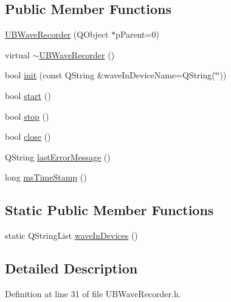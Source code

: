 \subsection*{Public Member Functions}
\begin{DoxyCompactItemize}
\item 
\hyperlink{class_u_b_wave_recorder_a6d2a1330302ac010e93b77d4d62737be}{U\-B\-Wave\-Recorder} (Q\-Object $\ast$p\-Parent=0)
\item 
virtual \hyperlink{class_u_b_wave_recorder_a4c444a83dd8d37c0eb1b244d4922f0fe}{$\sim$\-U\-B\-Wave\-Recorder} ()
\item 
bool \hyperlink{class_u_b_wave_recorder_acab7cce9f4a69c6bcbf219e9d7fb6e83}{init} (const Q\-String \&wave\-In\-Device\-Name=Q\-String(\char`\"{}\char`\"{}))
\item 
bool \hyperlink{class_u_b_wave_recorder_a77eb735ea7e29eca98dcc509afcaa8b7}{start} ()
\item 
bool \hyperlink{class_u_b_wave_recorder_a2e126369041b1c024b42a040d0d9e01a}{stop} ()
\item 
bool \hyperlink{class_u_b_wave_recorder_a061bf8de2624233eea17b658480b5e05}{close} ()
\item 
Q\-String \hyperlink{class_u_b_wave_recorder_ad508b294186513b816def5d194d9a5b3}{last\-Error\-Message} ()
\item 
long \hyperlink{class_u_b_wave_recorder_a7e8b48b4717383c8a7e2c50b132f705b}{ms\-Time\-Stamp} ()
\end{DoxyCompactItemize}
\subsection*{Static Public Member Functions}
\begin{DoxyCompactItemize}
\item 
static Q\-String\-List \hyperlink{class_u_b_wave_recorder_a01abc2b5f2cc6cec749f7075944f4b1c}{wave\-In\-Devices} ()
\end{DoxyCompactItemize}


\subsection{Detailed Description}


Definition at line 31 of file U\-B\-Wave\-Recorder.\-h.



